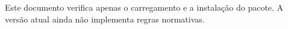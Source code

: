\documentclass{article}
\title{\ABNTEXmetadata{titulo}}
\author{\ABNTEXmetadata{autoria}}
\date{\ABNTEXmetadata{data}}
\begin{document}
\maketitle

Este documento verifica apenas o carregamento e a instalação do pacote.
A versão atual ainda não implementa regras normativas.
\end{document}
